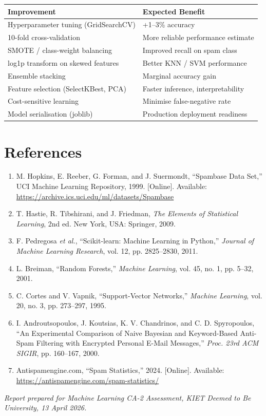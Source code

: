 \documentclass[12pt, a4paper]{article}
\begin{document}
\begin{table}[h]
\centering
\begin{tabular}{|l|l|}
\hline
\textbf{Improvement} & \textbf{Expected Benefit} \\ \hline
Hyperparameter tuning (GridSearchCV) & +1--3\% accuracy \\ \hline
10-fold cross-validation & More reliable performance estimate \\ \hline
SMOTE / class-weight balancing & Improved recall on spam class \\ \hline
log1p transform on skewed features & Better KNN / SVM performance \\ \hline
Ensemble stacking & Marginal accuracy gain \\ \hline
Feature selection (SelectKBest, PCA) & Faster inference, interpretability \\ \hline
Cost-sensitive learning & Minimise false-negative rate \\ \hline
Model serialisation (joblib) & Production deployment readiness \\ \hline
\end{tabular}
\end{table}

\section{References}

\begin{enumerate}
    \item M. Hopkins, E. Reeber, G. Forman, and J. Suermondt, ``Spambase Data Set,'' UCI Machine Learning Repository, 1999. [Online]. Available: \url{https://archive.ics.uci.edu/ml/datasets/Spambase}
    \item T. Hastie, R. Tibshirani, and J. Friedman, \textit{The Elements of Statistical Learning}, 2nd ed. New York, USA: Springer, 2009.
    \item F. Pedregosa \textit{et al.}, ``Scikit-learn: Machine Learning in Python,'' \textit{Journal of Machine Learning Research}, vol. 12, pp. 2825--2830, 2011.
    \item L. Breiman, ``Random Forests,'' \textit{Machine Learning}, vol. 45, no. 1, pp. 5--32, 2001.
    \item C. Cortes and V. Vapnik, ``Support-Vector Networks,'' \textit{Machine Learning}, vol. 20, no. 3, pp. 273--297, 1995.
    \item I. Androutsopoulos, J. Koutsias, K. V. Chandrinos, and C. D. Spyropoulos, ``An Experimental Comparison of Naive Bayesian and Keyword-Based Anti-Spam Filtering with Encrypted Personal E-Mail Messages,'' \textit{Proc. 23rd ACM SIGIR}, pp. 160--167, 2000.
    \item Antispamengine.com, ``Spam Statistics,'' 2024. [Online]. Available: \url{https://antispamengine.com/spam-statistics/}
\end{enumerate}

\vspace{1cm}
\begin{center}
\textit{Report prepared for Machine Learning CA-2 Assessment, KIET Deemed to Be University, 13 April 2026.}
\end{center}
\end{document}
